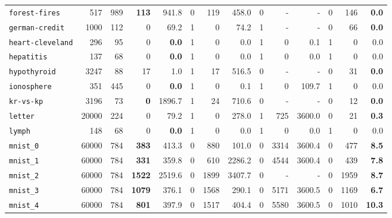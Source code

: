 \begin{tabular}{lccrrrrrrrrrrr}
\texttt{forest-fires} & \multicolumn{1}{r}{517} & \multicolumn{1}{r}{989}  & \textbf{113} & 941.8 & 0 & 119 & 458.0 & 0 & - & - & 0 & 146 & \textbf{0.0}\\
\texttt{german-credit} & \multicolumn{1}{r}{1000} & \multicolumn{1}{r}{112}  & 0 & 69.2 & 1 & 0 & 74.2 & 1 & - & - & 0 & 66 & \textbf{0.0}\\
\texttt{heart-cleveland} & \multicolumn{1}{r}{296} & \multicolumn{1}{r}{95}  & 0 & \textbf{0.0} & 1 & 0 & 0.0 & 1 & 0 & 0.1 & 1 & 0 & 0.0\\
\texttt{hepatitis} & \multicolumn{1}{r}{137} & \multicolumn{1}{r}{68}  & 0 & \textbf{0.0} & 1 & 0 & 0.0 & 1 & 0 & 0.0 & 1 & 0 & 0.0\\
\texttt{hypothyroid} & \multicolumn{1}{r}{3247} & \multicolumn{1}{r}{88}  & 17 & 1.0 & 1 & 17 & 516.5 & 0 & - & - & 0 & 31 & \textbf{0.0}\\
\texttt{ionosphere} & \multicolumn{1}{r}{351} & \multicolumn{1}{r}{445}  & 0 & \textbf{0.0} & 1 & 0 & 0.1 & 1 & 0 & 109.7 & 1 & 0 & 0.0\\
\texttt{kr-vs-kp} & \multicolumn{1}{r}{3196} & \multicolumn{1}{r}{73}  & \textbf{0} & 1896.7 & 1 & 24 & 710.6 & 0 & - & - & 0 & 12 & \textbf{0.0}\\
\texttt{letter} & \multicolumn{1}{r}{20000} & \multicolumn{1}{r}{224}  & 0 & 79.2 & 1 & 0 & 278.0 & 1 & 725 & 3600.0 & 0 & 21 & \textbf{0.3}\\
\texttt{lymph} & \multicolumn{1}{r}{148} & \multicolumn{1}{r}{68}  & 0 & \textbf{0.0} & 1 & 0 & 0.0 & 1 & 0 & 0.0 & 1 & 0 & 0.0\\
\texttt{mnist\_0} & \multicolumn{1}{r}{60000} & \multicolumn{1}{r}{784}  & \textbf{383} & 413.3 & 0 & 880 & 101.0 & 0 & 3314 & 3600.4 & 0 & 477 & \textbf{8.5}\\
\texttt{mnist\_1} & \multicolumn{1}{r}{60000} & \multicolumn{1}{r}{784}  & \textbf{331} & 359.8 & 0 & 610 & 2286.2 & 0 & 4544 & 3600.4 & 0 & 439 & \textbf{7.8}\\
\texttt{mnist\_2} & \multicolumn{1}{r}{60000} & \multicolumn{1}{r}{784}  & \textbf{1522} & 2519.6 & 0 & 1899 & 3407.7 & 0 & - & - & 0 & 1959 & \textbf{8.7}\\
\texttt{mnist\_3} & \multicolumn{1}{r}{60000} & \multicolumn{1}{r}{784}  & \textbf{1079} & 376.1 & 0 & 1568 & 290.1 & 0 & 5171 & 3600.5 & 0 & 1169 & \textbf{6.7}\\
\texttt{mnist\_4} & \multicolumn{1}{r}{60000} & \multicolumn{1}{r}{784}  & \textbf{801} & 397.9 & 0 & 1517 & 404.4 & 0 & 5580 & 3600.5 & 0 & 1010 & \textbf{10.3}\\

\end{tabular}
